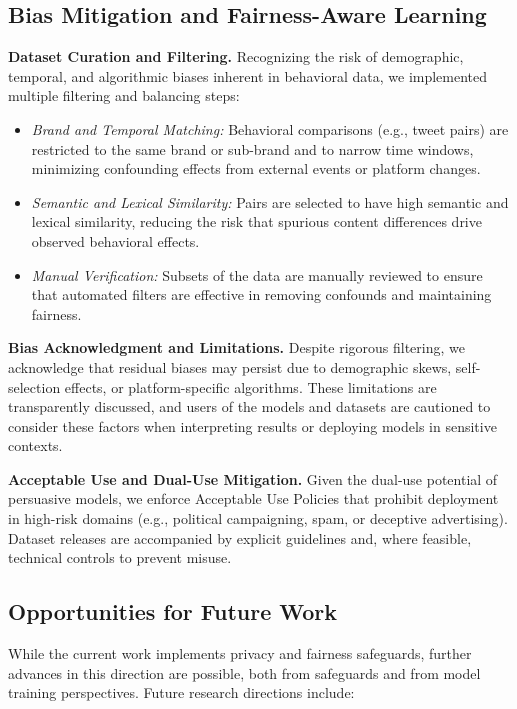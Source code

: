 \subsection{Bias Mitigation and Fairness-Aware Learning}
\textbf{Dataset Curation and Filtering.}
Recognizing the risk of demographic, temporal, and algorithmic biases inherent in behavioral data, we implemented multiple filtering and balancing steps:
\begin{itemize}

    \item \textit{Brand and Temporal Matching:} Behavioral comparisons (e.g., tweet pairs) are restricted to the same brand or sub-brand and to narrow time windows, minimizing confounding effects from external events or platform changes.
    
    \item \textit{Semantic and Lexical Similarity:} Pairs are selected to have high semantic and lexical similarity, reducing the risk that spurious content differences drive observed behavioral effects.

    \item \textit{Manual Verification:} Subsets of the data are manually reviewed to ensure that automated filters are effective in removing confounds and maintaining fairness.
\end{itemize}




\textbf{Bias Acknowledgment and Limitations.}
Despite rigorous filtering, we acknowledge that residual biases may persist due to demographic skews, self-selection effects, or platform-specific algorithms. These limitations are transparently discussed, and users of the models and datasets are cautioned to consider these factors when interpreting results or deploying models in sensitive contexts.


\textbf{Acceptable Use and Dual-Use Mitigation.}
Given the dual-use potential of persuasive models, we enforce Acceptable Use Policies that prohibit deployment in high-risk domains (e.g., political campaigning, spam, or deceptive advertising). Dataset releases are accompanied by explicit guidelines and, where feasible, technical controls to prevent misuse.


\subsection{Opportunities for Future Work}
While the current work implements privacy and fairness safeguards, further advances in this direction are possible, both from safeguards and from model training perspectives. Future research directions include:

